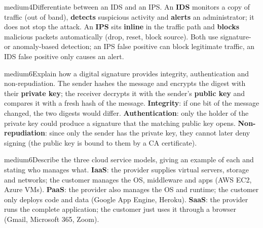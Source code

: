 \documentclass[10pt]{article}
\begin{document}
\begin{practice}{medium}{4}Differentiate between an IDS and an IPS.
\sol An \textbf{IDS} monitors a copy of traffic (out of band), \textbf{detects} suspicious activity and \textbf{alerts} an administrator; it does not stop the attack. An \textbf{IPS} sits \textbf{inline} in the traffic path and \textbf{blocks} malicious packets automatically (drop, reset, block source). Both use signature- or anomaly-based detection; an IPS false positive can block legitimate traffic, an IDS false positive only causes an alert.
\end{practice}

\begin{practice}{medium}{6}Explain how a digital signature provides integrity, authentication and non-repudiation.
\sol The sender hashes the message and encrypts the digest with their \textbf{private key}; the receiver decrypts it with the sender's \textbf{public key} and compares it with a fresh hash of the message.
\textbf{Integrity}: if one bit of the message changed, the two digests would differ. \textbf{Authentication}: only the holder of the private key could produce a signature that the matching public key opens. \textbf{Non-repudiation}: since only the sender has the private key, they cannot later deny signing (the public key is bound to them by a CA certificate).
\end{practice}

\begin{practice}{medium}{6}Describe the three cloud service models, giving an example of each and stating who manages what.
\sol \textbf{IaaS}: the provider supplies virtual servers, storage and networks; the customer manages the OS, middleware and apps (AWS EC2, Azure VMs). \textbf{PaaS}: the provider also manages the OS and runtime; the customer only deploys code and data (Google App Engine, Heroku). \textbf{SaaS}: the provider runs the complete application; the customer just uses it through a browser (Gmail, Microsoft 365, Zoom).
\end{practice}
\end{document}
